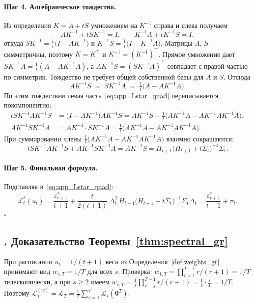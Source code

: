 \documentclass[a4paper,14pt,oneside,openany]{extarticle}
\newcommand{\cL}{\mathcal{L}}
\newcommand{\btheta}{\boldsymbol{\theta}}
\begin{document}
\paragraph{Шаг 4. Алгебраическое тождество.} Из определения $K = A + tS$ умножением на $K^{-1}$ справа и слева получаем
\[
    A K^{-1} + t S K^{-1} = I, \qquad K^{-1} A + t K^{-1} S = I,
\]
откуда $S K^{-1} = \tfrac{1}{t}\bigl(I - A K^{-1}\bigr)$ и $K^{-1} S = \tfrac{1}{t}\bigl(I - K^{-1} A\bigr)$. Матрицы $A$, $S$ симметричны, поэтому $K = K^\top$ и $K^{-1} = (K^{-1})^\top$. Прямое умножение дает $S K^{-1} A = \tfrac{1}{t}(A - A K^{-1} A)$, а $A K^{-1} S = (S K^{-1} A)^\top$ совпадает с правой частью по симметрии. Тождество не требует общей собственной базы для $A$ и $S$. Отсюда
\begin{equation}
    A K^{-1} S \;=\; S K^{-1} A \;=\; \tfrac{1}{t}\bigl(A - A K^{-1} A\bigr).
    \label{eq:app_AKS_identity}
\end{equation}
По этим тождествам левая часть~\eqref{eq:app_Lstar_quad} переписывается покомпонентно:
\begin{align*}
    t S K^{-1} A K^{-1} S &= \bigl(I - A K^{-1}\bigr) A K^{-1} S = A K^{-1} S - \tfrac{1}{t}\bigl(A K^{-1} A - A K^{-1} A K^{-1} A\bigr), \\
    A K^{-1} S K^{-1} A &= A K^{-1} \cdot S K^{-1} A = \tfrac{1}{t}\bigl(A K^{-1} A - A K^{-1} A K^{-1} A\bigr).
\end{align*}
При суммировании члены $\tfrac{1}{t}\bigl(A K^{-1} A - A K^{-1} A K^{-1} A\bigr)$ взаимно сокращаются:
\[
    t S K^{-1} A K^{-1} S + A K^{-1} S K^{-1} A = A K^{-1} S = H_{t+1}\bigl(H_{t+1} + t \Sigma_t\bigr)^{-1} \Sigma_t.
\]

\paragraph{Шаг 5. Финальная формула.} Подставляя в~\eqref{eq:app_Lstar_quad}:
\[
    \cL^*_t(u_t) = \frac{\varepsilon^*_{t+1}}{t+1} + \frac{t}{2(t+1)}\,\Delta_t^\top H_{t+1}\bigl(H_{t+1} + t \Sigma_t\bigr)^{-1} \Sigma_t \Delta_t = \frac{\varepsilon^*_{t+1}}{t+1} + \pi_t.
\]
\hfill$\square$

\subsection*{\theappthm. Доказательство Теоремы~\ref{thm:spectral_gr}}\label{app:proof_spectral_gr}

При расписании $u_t = 1/(t+1)$ веса из Определения~\ref{def:weights_gr} принимают вид $w_{s, T} = 1/T$ для всех $s$. Проверка: $w_{1, T} = \prod_{r=1}^{T-1} r/(r+1) = 1/T$ телескопически, а при $s \ge 2$ имеем $w_{s, T} = \tfrac{1}{s}\prod_{r=s}^{T-1} r/(r+1) = \tfrac{1}{s}\cdot \tfrac{s}{T} = 1/T$. Поэтому $\cL^{(w)}_T = \cL_T = \tfrac{1}{T}\sum_{s=1}^T \cL_s(\btheta^T)$.
\end{document}
